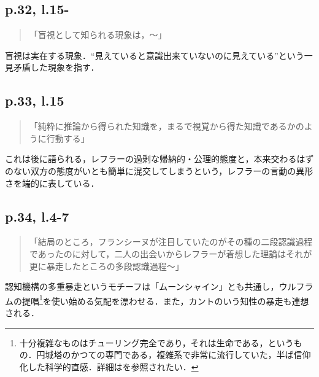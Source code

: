 \documentclass[10pt, a5paper, twoside]{jsarticle}
\theoremstyle{definition}
\begin{document}
            \subsection{p.32, l.15-}

                \begin{quote}

                    「盲視として知られる現象は，〜」

                \end{quote}

                盲視は実在する現象．“見えていると意識出来ていないのに見えている”という一見矛盾した現象を指す．

            \subsection{p.33, l.15}

                \begin{quote}

                    「純粋に推論から得られた知識を，まるで視覚から得た知識であるかのように行動する」

                \end{quote}

                これは後に語られる，レフラーの過剰な帰納的・公理的態度と，本来交わるはずのない双方の態度がいとも簡単に混交してしまうという，レフラーの言動の異形さを端的に表している．

            \subsection{p.34, l.4-7}

                \begin{quote}

                    「結局のところ，フランシーヌが注目していたのがその種の二段認識過程であったのに対して，二人の出会いからレフラーが着想した理論はそれが更に暴走したところの多段認識過程〜」

                \end{quote}

                認知機構の多重暴走というモチーフは「ムーンシャイン」とも共通し，ウルフラムの提唱\footnote{十分複雑なものはチューリング完全であり，それは生命である，というもの．円城塔のかつての専門である，複雑系で非常に流行していた，半ば信仰化した科学的直感．詳細は\cite{moon}を参照されたい．}を使い始める気配を漂わせる．また，カントのいう知性の暴走も連想される．
\end{document}

